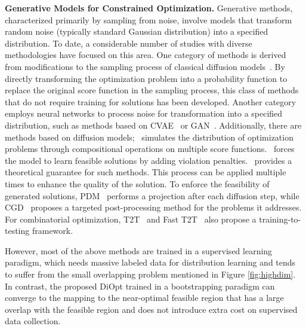 \textbf{Generative Models for Constrained Optimization.} Generative methods, characterized primarily by sampling from noise, involve models that transform random noise (typically standard Gaussian distribution) into a specified distribution. To date, a considerable number of studies with diverse methodologies have focused on this area. One category of methods is derived from modifications to the sampling process of classical diffusion models~\cite{zhang2024diffusion, kurtz2024equality, pan2024model}. By directly transforming the optimization problem into a probability function to replace the original score function in the sampling process, this class of methods that do not require training for solutions has been developed. Another category employs neural networks to process noise for transformation into a specified distribution, such as methods based on CVAE~\cite{li2023amortized} or GAN~\cite{salmona2022can}. Additionally, there are methods based on diffusion models;~\cite{briden2025diffusion} simulates the distribution of optimization problems through compositional operations on multiple score functions.~\cite{li2024diffusolve} forces the model to learn feasible solutions by adding violation penalties.~\cite{liang2024generative} provides a theoretical guarantee for such methods. This process can be applied multiple times to enhance the quality of the solution. To enforce the feasibility of generated solutions, PDM~\cite{christopher2024constrained} performs a projection after each diffusion step, while CGD~\cite{kondo2024cgd} proposes a targeted post-processing method for the problems it addresses. For combinatorial optimization, T2T~\cite{li2024distribution} and Fast T2T~\cite{li2024fast} also propose a training-to-testing framework. 

However, most of the above methods are trained in a supervised learning paradigm, which needs massive labeled data for distribution learning and tends to suffer from the small overlapping problem mentioned in Figure \ref{fig:highdim}. In contrast, the proposed DiOpt trained in a bootstrapping paradigm can converge to the mapping to the near-optimal feasible region that has a large overlap with the feasible region and does not introduce extra cost on supervised data collection.
